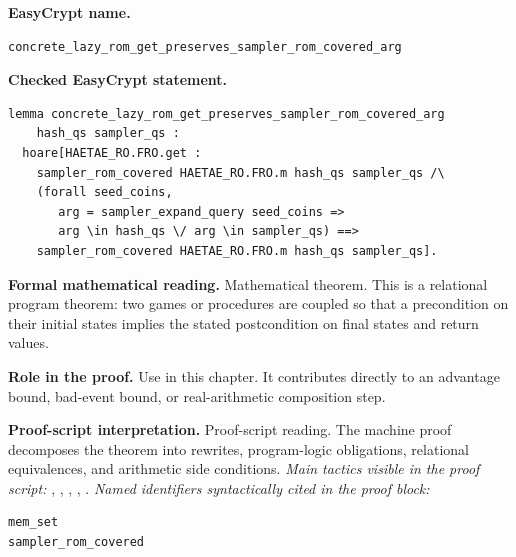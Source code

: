 \begin{formaltheorem}
\noindent\textbf{EasyCrypt name.}
\begin{lstlisting}[language=EasyCrypt,basicstyle=\ttfamily\scriptsize]
concrete_lazy_rom_get_preserves_sampler_rom_covered_arg
\end{lstlisting}
\noindent\textbf{Checked EasyCrypt statement.}
\begin{lstlisting}[language=EasyCrypt,basicstyle=\ttfamily\scriptsize]
lemma concrete_lazy_rom_get_preserves_sampler_rom_covered_arg
    hash_qs sampler_qs :
  hoare[HAETAE_RO.FRO.get :
    sampler_rom_covered HAETAE_RO.FRO.m hash_qs sampler_qs /\
    (forall seed_coins,
       arg = sampler_expand_query seed_coins =>
       arg \in hash_qs \/ arg \in sampler_qs) ==>
    sampler_rom_covered HAETAE_RO.FRO.m hash_qs sampler_qs].
\end{lstlisting}
\noindent\textbf{Formal mathematical reading.}
Mathematical theorem. This is a relational program theorem: two games or procedures are coupled so that a precondition on their initial states implies the stated postcondition on final states and return values.

\noindent\textbf{Role in the proof.}
Use in this chapter. It contributes directly to an advantage bound, bad-event bound, or real-arithmetic composition step.

\noindent\textbf{Proof-script interpretation.}
Proof-script reading. The machine proof decomposes the theorem into rewrites, program-logic obligations, relational equivalences, and arithmetic side conditions.
\emph{Main tactics visible in the proof script:} \ec{proc}, \ec{wp}, \ec{rnd}, \ec{rewrite}, \ec{smt}.
\emph{Named identifiers syntactically cited in the proof block:}
\begin{lstlisting}[language=EasyCrypt,basicstyle=\ttfamily\scriptsize]
mem_set
sampler_rom_covered
\end{lstlisting}

\end{formaltheorem}

